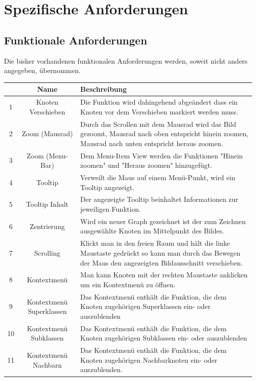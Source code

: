 \documentclass[11pt,a4paper]{article}
\begin{document}
\section{Spezifische Anforderungen} %
	\subsection{Funktionale Anforderungen} %
	
	Die bisher vorhandenen funktionalen Anforderungen werden, soweit nicht anders angegeben, übernommen.

\vspace*{1cm}
\hspace*{-0.8cm}
\begin{tabular}{|c|c|p{10cm}|}
\hline 
 & Name & Beschreibung \\ 
\hline 
1 & Knoten Verschieben & Die Funktion wird dahingehend abgeändert dass ein Knoten vor dem Verschieben markiert werden muss. \\ 
\hline 
2 & Zoom (Mausrad) & Durch das Scrollen mit dem Mausrad wird das Bild gezoomt, Mausrad nach oben entspricht hinein zoomen, Mausrad nach unten entspricht heraus zoomen. \\ 
\hline 
3 & Zoom (Menu-Bar) & Dem Menu-Item View werden die Funktionen "Hinein zoomen" und "Heraus zoomen" hinzugefügt. \\ 
\hline 
4 & Tooltip & Verweilt die Maus auf einem Menü-Punkt, wird ein Tooltip angezeigt. \\ 
\hline 
5 & Tooltip Inhalt & Der angezeigte Tooltip beinhaltet Informationen zur jeweiligen Funktion. \\ 
\hline 
6 & Zentrierung & Wird ein neuer Graph gezeichnet ist der zum Zeichnen ausgewählte Knoten im Mittelpunkt des Bildes. \\ 
\hline 
7 & Scrolling & Klickt man in den freien Raum und hält die linke Maustaste gedrückt so kann man durch das Bewegen der Maus den angezeigten Bildausschnitt verschieben.  \\ 
\hline 
8 & Kontextmenü & Man kann Knoten mit der rechten Maustaste anklicken um ein Kontextmenü zu öffnen. \\ 
\hline 
9 & Kontextmenü Superklassen & Das Kontextmenü enthält die Funktion, die dem Knoten zugehörigen Superklassen ein- oder auszublenden \\ 
\hline 
10 & Kontextmenü Subklassen & Das Kontextmenü enthält die Funktion, die dem Knoten zugehörigen Subklassen ein- oder auszublenden \\ 
\hline 
11 & Kontextmenü Nachbarn & Das Kontextmenü enthält die Funktion, die dem Knoten zugehörigen Nachbarknoten ein- oder auszublenden.  \\ 
\hline 
\end{tabular} \newpage
\end{document}
